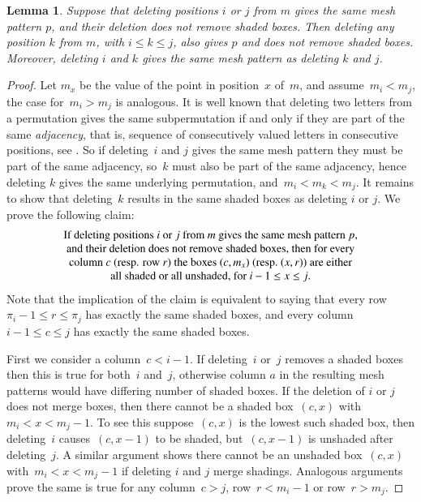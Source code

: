 \documentclass[preprint,11pt]{elsarticle}
\newtheorem{lem}[thm]{Lemma}\crefname{lem}{Lemma}{Lemmas}
\numberwithin{equation}{section}
\numberwithin{figure}{section}
\numberwithin{thm}{section}
\begin{document}
\begin{lem}\label{lem:adj}
Suppose that deleting positions $i$ or $j$ from $m$ gives the same mesh pattern $p$, and their deletion does not remove shaded boxes.
Then deleting any position $k$ from $m$, with $i\le k\le j$, also gives $p$ and does not remove shaded boxes.
Moreover, deleting $i$ and $k$ gives the same mesh pattern as deleting $k$ and $j$.
\end{lem}

\begin{proof}
Let $m_x$ be the value of the point in position~$x$ of~$m$, and assume~$m_i<m_j$, the case for~$m_i>m_j$ is analogous.
 It is well known that deleting two letters from a permutation gives the same subpermutation if and only if they are part
 of the same \emph{adjacency}, that is, sequence of consecutively valued letters in consecutive positions, see \cite{Smith15}. So if deleting~$i$ and
 $j$ gives the same mesh pattern they must be part of the same adjacency, so~$k$ must also be part of the same adjacency,
 hence deleting $k$ gives the same underlying permutation, and~$m_i<m_k<m_j$.
 It remains to show that deleting~$k$ results in the same shaded boxes as deleting $i$ or $j$. We prove the following claim:
 \begin{equation*}
  \begin{tabular}{c}
   If deleting positions $i$ or $j$ from $m$ gives the same mesh pattern $p$,\\
   and their deletion does not remove shaded boxes, then for every\\ column~$c$
   (resp. row~$r$) the boxes~$(c,m_x)$ (resp.~$(x,r)$) are either\\ all shaded or all unshaded, for~$i-1\le x\le j$.
  \end{tabular}
 \end{equation*}
 Note that the implication of the claim is equivalent to saying that every row~$\pi_i-1\le r\le \pi_j$ has exactly the same shaded boxes,
 and every column~$i-1\le c\le j$ has exactly the same shaded boxes.

First we consider a column~$c<i-1$. If deleting~$i$ or~$j$ removes a shaded boxes then this is true for both~$i$ and~$j$,
 otherwise column $a$ in the resulting mesh patterns would have differing number of shaded boxes. If the deletion of $i$ or $j$ does not merge boxes,
 then there cannot be a shaded box~$(c,x)$ with~$m_i<x<m_j-1$. To see this suppose~$(c,x)$ is the lowest such shaded box, then deleting~$i$
 causes~$(c,x-1)$ to be shaded, but~$(c,x-1)$ is unshaded after deleting~$j$. A similar argument shows there cannot be an unshaded box~$(c,x)$ with~$m_i<x<m_j-1$
 if deleting $i$ and $j$ merge shadings. Analogous arguments prove the same is true for any column~$c>j$, row~$r<m_i-1$ or row~$r>m_j$.


\end{proof}
\end{document}

